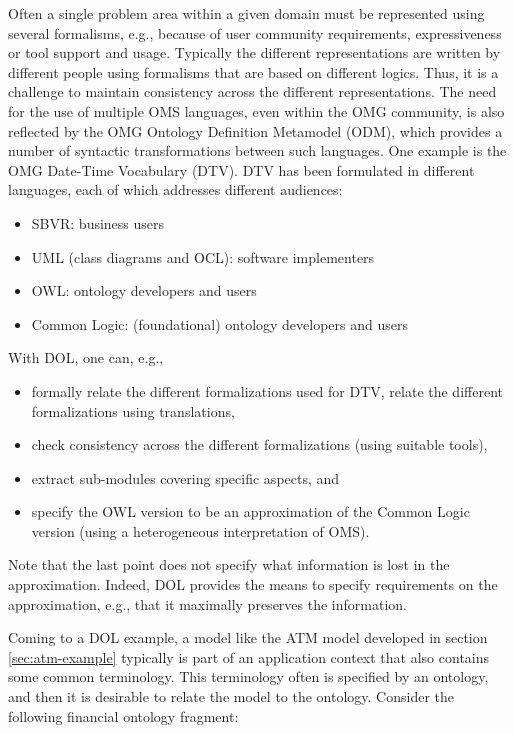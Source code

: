 \documentclass[10pt,fleqn,%
\ifpretendfinal
final%
\else
draft%
\fi,
]{scrreprt}
\begin{document}
Often a single problem area within a given domain must be represented using several formalisms, e.g., because of user community requirements, expressiveness or tool support 
and usage. 
Typically the different representations are written by different people using formalisms that are based on different logics. Thus, it is a challenge to maintain 
consistency across the different representations. 
The need for the use of multiple OMS languages, even within the OMG community, is also reflected by the OMG Ontology Definition Metamodel (ODM), which 
provides a number of syntactic transformations between such languages.
One example is the OMG Date-Time Vocabulary (DTV). DTV has been formulated in different languages, each of which addresses different audiences:
\begin{itemize}
\item	 SBVR: business users
\item 	UML (class diagrams and OCL): software implementers
\item 	OWL: ontology developers and users
\item 	Common Logic: (foundational) ontology developers and users
\end{itemize}
With DOL, one can, e.g.,
\begin{itemize}
\item 	formally relate the different formalizations used for DTV, relate the different formalizations using translations,
\item 	check consistency across the different formalizations (using suitable tools),
\item 	extract sub-modules covering specific aspects, and
\item 	specify the OWL version to be an approximation of the Common Logic version (using a heterogeneous interpretation of OMS).
\end{itemize}
Note that the last point does not specify what information is lost in the approximation. Indeed, DOL provides the means to specify requirements on the approximation, e.g., that it maximally preserves the information. 

Coming to a DOL example,
a model like the ATM model developed in section \ref{sec:atm-example} typically is part of an
application context that also contains some common terminology.
This terminology often is specified by an ontology, and then
it is desirable to relate the model to the ontology. Consider
the following financial ontology fragment:
\end{document}
